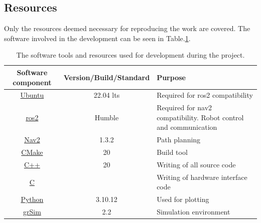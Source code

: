 \subsection{Resources}
Only the resources deemed necessary for reproducing the work are covered.
The software involved in the development can be seen in Table.\:\ref{tab:software_tools}.
\begin{table}[H]
	\centering
	\caption{The software tools and resources used for development during the project.}
	\label{tab:software_tools}
	\begin{tabularx}{\textwidth}{|c|c|X|} \hline
		\rowcolor{light_grey} \textbf{Software component}                              & \textbf{Version/Build/Standard} & \textbf{Purpose}                                                 \\ \hline
		\href{https://releases.ubuntu.com/jammy/}{Ubuntu}                              & 22.04 \acs{lts}                 & Required for \acs{ros2} compatibility                            \\ \hline
		\href{https://docs.ros.org/en/humble/index.html}{\acs{ros2}}                   & Humble                          & Required for nav2 compatibility. Robot control and communication \\ \hline
		\href{https://docs.nav2.org/index.html}{Nav2}                                  & 1.3.2                           & Path planning                                                    \\ \hline
		\href{https://cmake.org/}{CMake}                                               & 20                              & Build tool                                                       \\ \hline
		\href{https://en.cppreference.com/w/cpp/20}{C++}                               & 20                              & Writing of all source code                                       \\ \hline
		\href{}{C}                                                                     &                                 & Writing of hardware interface code                               \\ \hline
		\href{https://www.python.org/downloads/release/python-31012/}{Python}          & 3.10.12                         & Used for plotting                                                \\ \hline
		\href{https://github.com/RoboCup-SSL/grSim}{grSim}                             & 2.2                             & Simulation environment                                           \\ \hline

\end{tabularx}
\end{table}
